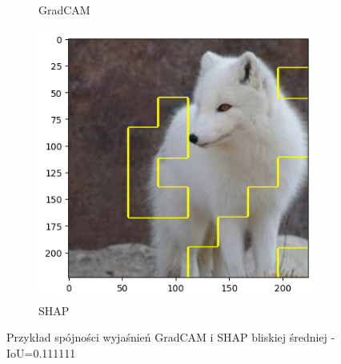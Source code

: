 \begin{figure}[h]
\begin{subfigure}[b]{0.3\textwidth}
		\caption{GradCAM}  \label{}
	\end{subfigure}
	\begin{subfigure}[b]{0.3\textwidth}
		\centering\includegraphics[width=.9\textwidth]{img/examples/appendix/n02120079_49517_shap}
		\caption{SHAP}
	\end{subfigure}
	\caption{Przykład spójności wyjaśnień GradCAM i SHAP bliskiej średniej - IoU=0.111111}
	\label{}
\end{figure}
